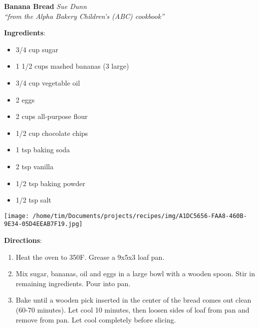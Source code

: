 \documentclass[11pt, twoside, openany]{book}
\begin{document}
\noindent\begin{minipage}[t]{\linewidth}%
{\Large\textbf{Banana Bread}} \label{banana-bread}\hfill\textit{Sue Dunn}\\
\textit{``from the Alpha Bakery Children's (ABC) cookbook''}\\
\noindent\begin{minipage}[t]{0.78\linewidth}%
\textbf{Ingredients}:\vspace{-3mm}
\begin{multicols}{2}
\begin{itemize}\setlength\itemsep{-1mm}
\item 3/4 cup sugar
\item 1 1/2 cups mashed bananas (3 large)
\item 3/4 cup vegetable oil
\item 2 eggs
\item 2 cups all-purpose flour
\item 1/2 cup chocolate chips
\item 1 tsp baking soda
\item 2 tsp vanilla
\item 1/2 tsp baking powder
\item 1/2 tsp salt
\end{itemize}
\end{multicols}
\end{minipage}
\noindent\begin{minipage}[t]{0.18\linewidth}
\centering \strut\vspace*{-\baselineskip}\newline
\texttt{[image: /home/tim/Documents/projects/recipes/img/A1DC5656-FAA8-460B-9E34-05D4EEAB7F19.jpg]}\\
\end{minipage}\vspace{3mm}
\textbf{Directions}:
\vspace{-3mm}\begin{enumerate}\setlength\itemsep{-1mm}
\item Heat the oven to 350F. Grease a 9x5x3 loaf pan.
\item Mix sugar, bananas, oil and eggs in a large bowl with a wooden spoon. Stir in remaining ingredients. Pour into pan.
\item Bake until a wooden pick inserted in the center of the bread comes out clean (60-70 minutes). Let cool 10 minutes, then loosen sides of loaf from pan and remove from pan. Let cool completely before slicing. 
\end{enumerate}
\end{minipage}\vspace{8mm}
\end{document}
